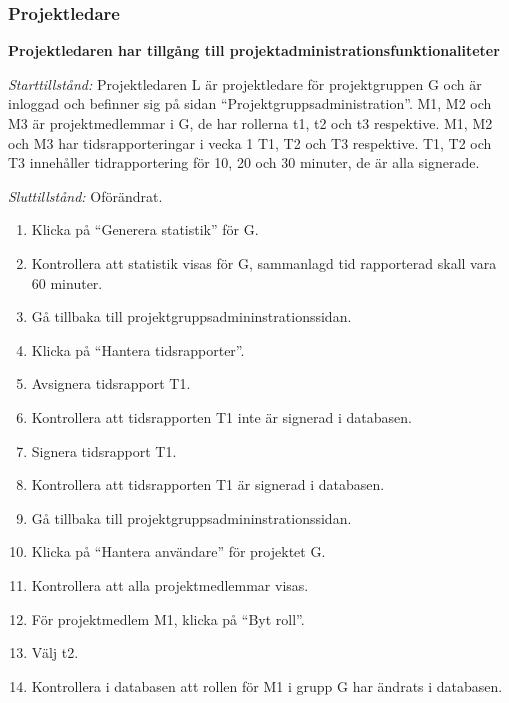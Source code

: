 \documentclass[a4paper]{article}
\begin{document}
\subsubsection{Projektledare}
\begin{ST}
\item \textbf{Projektledaren har tillgång till projektadministrationsfunktionaliteter}

\emph{Starttillstånd:} Projektledaren L är projektledare för projektgruppen G och är inloggad och befinner sig på sidan ``Projektgruppsadministration''. M1, M2 och M3 är projektmedlemmar i G, de har rollerna t1, t2 och t3 respektive. M1, M2 och M3 har tidsrapporteringar i vecka 1 T1, T2 och T3 respektive. T1, T2 och T3 innehåller tidrapportering för 10, 20 och 30 minuter, de är alla signerade.

\emph{Sluttillstånd:} Oförändrat.

\begin{enumerate}
\item Klicka på ``Generera statistik'' för G.
\item Kontrollera att statistik visas för G, sammanlagd tid rapporterad skall vara 60 minuter.
\item Gå tillbaka till projektgruppsadmininstrationssidan.
\item Klicka på ``Hantera tidsrapporter''.
\item Avsignera tidsrapport T1.
\item Kontrollera att tidsrapporten T1 inte är signerad i databasen.
\item Signera tidsrapport T1.
\item Kontrollera att tidsrapporten T1 är signerad i databasen.
\item Gå tillbaka till projektgruppsadmininstrationssidan.
\item Klicka på ``Hantera användare'' för projektet G.
\item Kontrollera att alla projektmedlemmar visas.
\item För projektmedlem M1, klicka på ``Byt roll''.
\item Välj t2.
\item Kontrollera i databasen att rollen för M1 i grupp G har ändrats i databasen.
\end{enumerate}
\end{ST}
\end{document}
